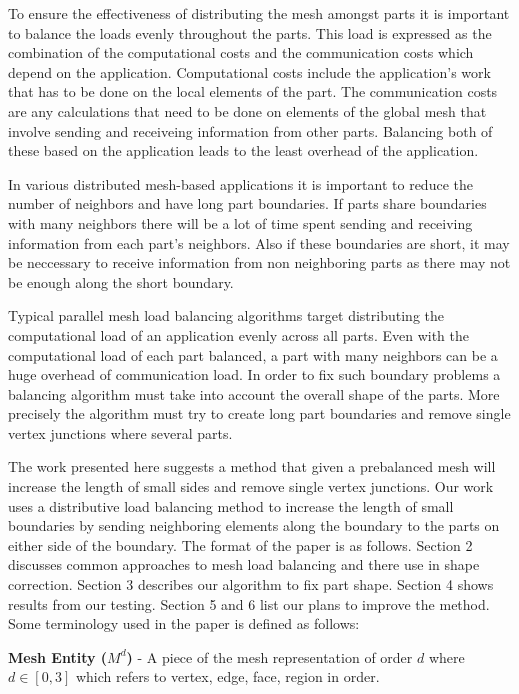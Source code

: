 \documentclass{thesis}
\begin{document}
To ensure the effectiveness of distributing the mesh amongst parts it is important to balance the loads evenly throughout the parts. This load is expressed as the combination of the computational costs and the communication costs which depend on the application. Computational costs include the application's work that has to be done on the local elements of the part. The communication costs are any calculations that need to be done on elements of the global mesh that involve sending and receiveing information from other parts.  Balancing both of these based on the application leads to the least overhead of the application.

In various distributed mesh-based applications it is important to reduce the 
number of neighbors and have long part boundaries. If parts share boundaries 
with many neighbors there will be a lot of time spent sending and receiving 
information from each part's neighbors. Also if these boundaries are short, it 
may be neccessary to receive information from non neighboring parts as there 
may not be enough along the short boundary. 

Typical parallel mesh load balancing algorithms target distributing the 
computational load of an application evenly across all parts. Even with the 
computational load of each part balanced, a part with many neighbors can be a 
huge overhead of communication load. In order to fix such boundary problems a 
balancing algorithm must take into account the overall shape of the parts. 
More precisely the algorithm must try to create long part boundaries and remove 
single vertex junctions where several parts.

The work presented here suggests a method that given a prebalanced mesh will 
increase the length of small sides and remove single vertex junctions. Our work 
uses a distributive load balancing method to increase the length of small 
boundaries by sending neighboring elements along the boundary to the parts on 
either side of the boundary. The format of the paper is as follows. Section 2 
discusses common approaches to mesh load balancing and there use in shape 
correction. Section 3 describes our algorithm to fix part shape. Section 4 
shows results from our testing. Section 5 and 6 list our plans to improve the 
method. Some terminology used in the paper is defined as follows:

{\bf Mesh Entity ($M^d$)} - A piece of the mesh representation of order $d$ where $d \in [0,3]$ which refers to vertex, edge, face, region in order.
\end{document}
